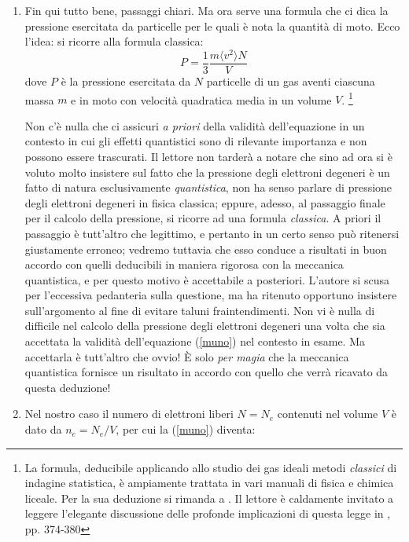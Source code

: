 \begin{enumerate}
\item
Fin qui tutto bene, passaggi chiari. Ma ora serve una formula che ci dica la pressione esercitata da particelle per le quali è nota la quantit\`{a} di moto. Ecco l'idea: si ricorre  alla formula classica:
\begin{equation}\label{muno}
P=\frac{1}{3} \frac{m \langle v^{2} \rangle N}{V}
\end{equation}
dove $P$ è la pressione esercitata da $N$ particelle di un gas  aventi ciascuna massa $m$ e in moto con velocit\`{a} quadratica media in un volume $V$.
\footnote{La formula, deducibile applicando allo studio dei gas ideali metodi \emph{classici} di indagine statistica, è ampiamente trattata in vari manuali di fisica e chimica liceale. Per la sua deduzione si rimanda a \Cite{caf}. Il lettore è caldamente invitato a leggere l'elegante discussione delle profonde implicazioni di questa legge in \Cite{mun}, pp. 374-380}
\par
Non c'è nulla che ci assicuri \emph{a priori} della validit\`{a} dell'equazione in un contesto in cui gli effetti quantistici sono di rilevante importanza e non possono essere trascurati. Il lettore non tarder\`{a} a notare che sino ad ora si è voluto molto insistere sul fatto che la pressione degli elettroni degeneri è un fatto di natura esclusivamente \emph{quantistica}, non ha senso parlare di pressione degli elettroni degeneri in fisica classica; eppure, adesso, al passaggio finale per il calcolo della pressione, si ricorre ad una formula \emph{classica}. A priori il passaggio è tutt'altro che legittimo, e pertanto in un certo senso può ritenersi giustamente erroneo; vedremo tuttavia che esso conduce a risultati in buon accordo con quelli deducibili in maniera rigorosa con la meccanica quantistica, e per questo motivo è accettabile a posteriori. L'autore si scusa per l'eccessiva pedanteria sulla questione, ma ha ritenuto opportuno insistere sull'argomento al fine di evitare taluni fraintendimenti. Non vi è nulla di difficile nel calcolo della pressione degli elettroni degeneri una volta che sia accettata la validit\`{a} dell'equazione (\ref{muno}) nel contesto in esame. Ma accettarla è tutt'altro che ovvio! \`E solo \emph{per magia} che la meccanica quantistica fornisce un risultato in accordo con quello che verr\`{a} ricavato da questa deduzione!
\item
Nel nostro caso il numero di elettroni liberi  $N=N_{e}$ contenuti nel volume $V$ è dato da $n_{e}=N_{e}/V$, per cui la (\ref{muno}) diventa:
\begin{equation}

\end{equation}
\end{enumerate}
